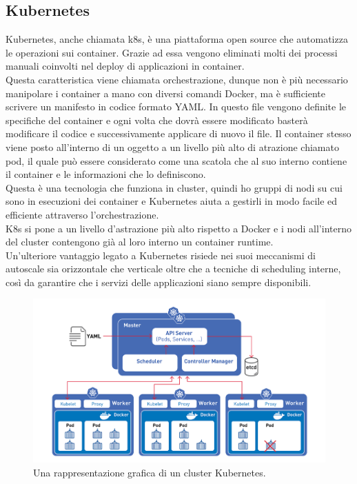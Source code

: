 \documentclass[a4paper,12pt]{report}
\begin{document}
\subsection{Kubernetes}
Kubernetes, anche chiamata k8s, è una piattaforma open source che automatizza le operazioni sui container. Grazie ad essa vengono eliminati molti dei processi manuali coinvolti nel deploy di applicazioni in container. \\
Questa caratteristica viene chiamata orchestrazione, dunque non è più necessario manipolare i container a mano con diversi comandi Docker, ma è sufficiente scrivere un manifesto in codice formato YAML. In questo file vengono definite le specifiche del container e ogni volta che dovrà essere modificato basterà modificare il codice e successivamente applicare di nuovo il file. Il container stesso viene posto all'interno di un oggetto a un livello più alto di atrazione chiamato pod, il quale può essere considerato come una scatola che al suo interno contiene il container e le informazioni che lo definiscono.\\
Questa è una tecnologia che funziona in cluster, quindi ho gruppi di nodi su cui sono in esecuzioni dei container e Kubernetes aiuta a gestirli in modo facile ed efficiente attraverso l'orchestrazione.\\
K8s si pone a un livello d'astrazione più alto rispetto a Docker e i nodi all'interno del cluster contengono già al loro interno un container runtime.\cite{kubernetes}\\ 
Un'ulteriore vantaggio legato a Kubernetes risiede nei suoi meccanismi di autoscale sia orizzontale che verticale oltre che a tecniche di scheduling interne, così da garantire che i servizi delle applicazioni siano sempre disponibili.


\begin{figure}[h]
	\includegraphics[width=1.0\textwidth]{k8s}
    \caption{Una rappresentazione grafica di un cluster Kubernetes. \cite{k8simg}}
    \label{fig:k8s}
\end{figure}
\end{document}
